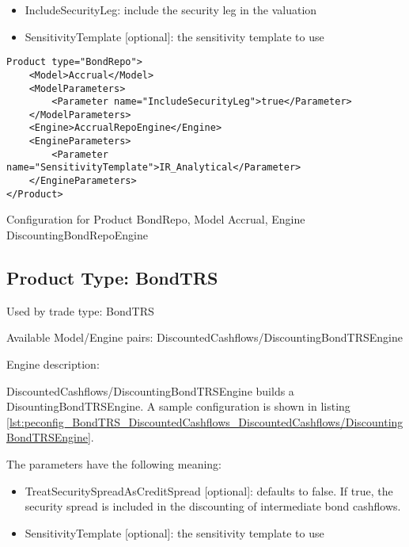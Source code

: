 \begin{itemize}
\item IncludeSecurityLeg: include the security leg in the valuation
\item SensitivityTemplate [optional]: the sensitivity template to use 
\end{itemize}

\begin{longlisting}
\begin{verbatim}
Product type="BondRepo">
    <Model>Accrual</Model>
    <ModelParameters>
        <Parameter name="IncludeSecurityLeg">true</Parameter>
    </ModelParameters>
    <Engine>AccrualRepoEngine</Engine>
    <EngineParameters>
        <Parameter name="SensitivityTemplate">IR_Analytical</Parameter>
    </EngineParameters>
</Product>
\end{verbatim}
\caption{Configuration for Product BondRepo, Model Accrual, Engine DiscountingBondRepoEngine}
\label{lst:peconfig_BondRepo_Accrual_AccrualBondRepoEngine}
\end{longlisting}

\subsection{Product Type: BondTRS}

Used by trade type: BondTRS

Available Model/Engine pairs: DiscountedCashflows/DiscountingBondTRSEngine

Engine description:

DiscountedCashflows/DiscountingBondTRSEngine builds a DisountingBondTRSEngine. A sample configuration is shown in listing \ref{lst:peconfig_BondTRS_DiscountedCashflows_DiscountedCashflows/DiscountingBondTRSEngine}.

The parameters have the following meaning:

\begin{itemize}
\item TreatSecuritySpreadAsCreditSpread [optional]: defaults to false. If true, the security spread is included in the
  discounting of intermediate bond cashflows.
\item SensitivityTemplate [optional]: the sensitivity template to use 
\end{itemize}

